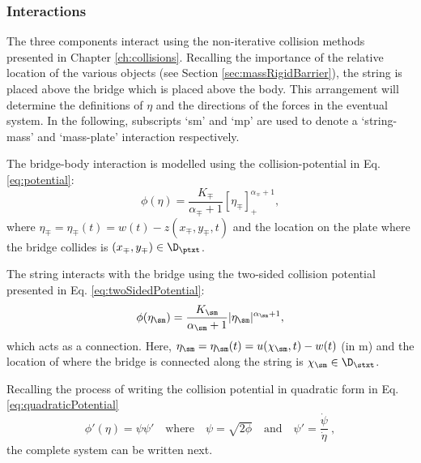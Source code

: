 \subsubsection{Interactions}
The three components interact using the non-iterative collision methods presented in Chapter \ref{ch:collisions}. Recalling the importance of the relative location of the various objects (see Section \ref{sec:massRigidBarrier}), the string is placed above the bridge which is placed above the body. This arrangement will determine the definitions of $\eta$ and the directions of the forces in the eventual system. In the following, subscripts `sm' and `mp' are used to denote a `string-mass' and `mass-plate' interaction respectively.

The bridge-body interaction is modelled using the collision-potential in Eq. \eqref{eq:potential}:
\begin{equation}
    \phi(\eta) = \frac{K_\mp}{\alpha_\mp+1}[\eta_\mp]_+^{\alpha_\mp+1},
\end{equation}
where $\eta_\mp = \eta_\mp(t) = w(t) - z(x_\mp, y_\mp, t)$ and the location on the plate where the bridge collides is $(x_\mp, y_\mp)\in \D_\ptxt$. 

The string interacts with the bridge using the two-sided collision potential presented in Eq. \eqref{eq:twoSidedPotential}:
\begin{equation}\label{eq:stringMassPotential}
    \phi(\eta_\sm) = \frac{K_\sm}{\alpha_\sm+1}|\eta_\sm|^{\alpha_\sm+1},
\end{equation}
which acts as a connection.  Here, $\eta_\sm = \eta_\sm(t) = u(\chi_\sm, t) - w(t)$ (in m) and the location of where the bridge is connected along the string is $\chi_\sm \in \D_\stxt$. 

Recalling the process of writing the collision potential in quadratic form in Eq. \eqref{eq:quadraticPotential}
\begin{equation}\label{eq:quadraticPotentialTromba}
    \phi'(\eta) = \psi\psi' \quad \text{where} \quad \psi = \sqrt{2\phi} \quad \text{and} \quad \psi' = \frac{\dot{\psi}}{\dot{\eta}}\ ,
\end{equation}
the complete system can be written next.

